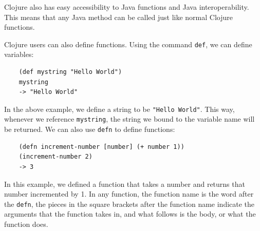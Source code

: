 \documentclass[12pt]{article}
\newcommand{\comment}[1]{{\bf \tt  {#1}}}
\newcommand{\emcomment}[1]{\textcolor{ForestGreen}{\comment{Elena: {#1}}}}
\begin{document}
Clojure also has easy accessibility to Java functions and Java
interoperability. This means that any Java method can be called just
like normal Clojure functions.


Clojure users can also define functions.
Using the command \texttt{def}, we can define variables:
\begin{verbatim}
	(def mystring "Hello World")
	mystring
	-> "Hello World"
\end{verbatim}

In the above example, we define a string to be \texttt{"Hello World"}. This way, whenever we reference 
\texttt{mystring}, the string we bound to the variable name will be returned. We can also use
\texttt{defn} to define functions:
\begin{verbatim}
	(defn increment-number [number] (+ number 1))
	(increment-number 2)
	-> 3
\end{verbatim}

In this example, we defined
a function that takes a number and returns that number incremented by 1.
In any function, the function name is the word after the \texttt{defn}, the pieces in the square
brackets after the function name indicate 
the arguments that the function takes in, and what follows is the body, or what the function does.
\end{document}
